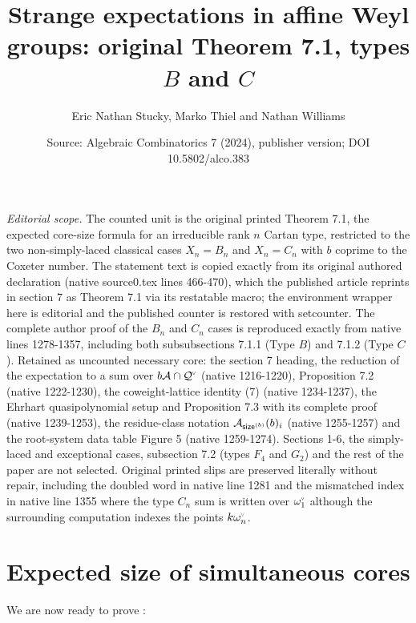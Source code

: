 \documentclass[10pt,a4paper]{amsart}
\title[Expected core size, types B and C]{Strange expectations in affine Weyl groups: original Theorem 7.1, types $B$ and $C$}
\author{Eric Nathan Stucky, Marko Thiel and Nathan Williams}
\date{Source: Algebraic Combinatorics 7 (2024), publisher version; DOI 10.5802/alco.383}
\newcommand{\chk}[1]{#1^{\normalfont\smash{\scalebox{.5}[.5]{\rotatebox{90}{\textbf{\textless}}}}}}
\newcommand{\Q}{\mathcal{Q}}
\newcommand{\ac}{\mathcal{A}}
\newcommand{\cw}{\chk{\omega}}
\newcommand{\size}{{\sf size}}
\newcommand{\sizeb}{\size^{(b)}}
\theoremstyle{definition}
\theoremstyle{remark}
\begin{document}
\maketitle
\noindent\textit{Editorial scope.} The counted unit is the original printed Theorem 7.1, the expected core-size formula for an irreducible rank $n$ Cartan type, restricted to the two non-simply-laced classical cases $X_n=B_n$ and $X_n=C_n$ with $b$ coprime to the Coxeter number. The statement text is copied exactly from its original authored declaration (native source0.tex lines 466-470), which the published article reprints in section 7 as Theorem 7.1 via its restatable macro; the environment wrapper here is editorial and the published counter is restored with setcounter. The complete author proof of the $B_n$ and $C_n$ cases is reproduced exactly from native lines 1278-1357, including both subsubsections 7.1.1 (Type $B$) and 7.1.2 (Type $C$). Retained as uncounted necessary core: the section 7 heading, the reduction of the expectation to a sum over $b\ac\cap\chk{\Q}$ (native 1216-1220), Proposition 7.2 (native 1222-1230), the coweight-lattice identity (7) (native 1234-1237), the Ehrhart quasipolynomial setup and Proposition 7.3 with its complete proof (native 1239-1253), the residue-class notation $\ac_{\sizeb}(b)_i$ (native 1255-1257) and the root-system data table Figure 5 (native 1259-1274). Sections 1-6, the simply-laced and exceptional cases, subsection 7.2 (types $F_4$ and $G_2$) and the rest of the paper are not selected. Original printed slips are preserved literally without repair, including the doubled word in native line 1281 and the mismatched index in native line 1355 where the type $C_n$ sum is written over $\cw_1$ although the surrounding computation indexes the points $k\cw_n$.
\setcounter{section}{6}
\section{Expected size of simultaneous cores}
\label{sec:expectation}

We are now ready to prove :
\end{document}
